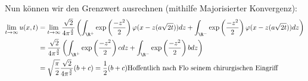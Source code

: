 \begin{solution}
\begin{align*}
\end{align*}
Nun können wir den Grenzwert ausrechnen (mithilfe Majorisierter Konvergenz):
\begin{align*}
  \lim_{t \to \infty} u(x,t) &= \lim_{t \to \infty}
  \frac{\sqrt{2}}{4 \pi^{\frac{3}{2}}} \left(\int_{\R^{+}} \exp\left(\frac{-z^2}{2}\right)\varphi(x-z(a \sqrt{2t})) dz + \int_{\R^{-}} \exp\left(\frac{-z^2}{2}\right)\varphi(x-z(a \sqrt{2t})) dz \right) \\
  &= \frac{\sqrt{2}}{4 \pi^{\frac{3}{2}}} \left(\int_{\R^{+}} \exp\left(\frac{-z^2}{2}\right)c dz + \int_{\R^{-}} \exp\left(\frac{-z^2}{2}\right)b dz \right) \\
  &= \sqrt{\frac{\pi}{2}} \frac{\sqrt{2}}{4 \pi^{\frac{3}{2}}} (b+c) = \frac{1}{2} (b+c) \text{Hoffentlich nach Flo seinem chirurgischen Eingriff}
\end{align*}
\end{solution}

